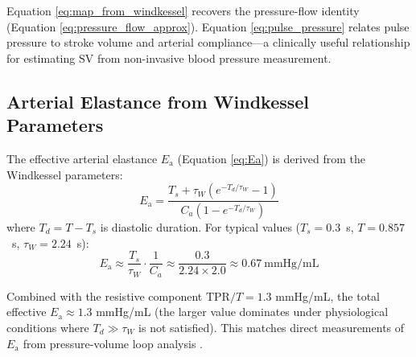 \documentclass[10pt,twocolumn,a4paper]{article}
\theoremstyle{remark}
\newcommand{\Ea}{E_{\mathrm{a}}}
\newcommand{\SV}{\mathrm{SV}}
\newcommand{\TPR}{\mathrm{TPR}}
\begin{document}
Equation \ref{eq:map_from_windkessel} recovers the pressure-flow identity (Equation \ref{eq:pressure_flow_approx}). Equation \ref{eq:pulse_pressure} relates pulse pressure to stroke volume and arterial compliance—a clinically useful relationship for estimating $\SV$ from non-invasive blood pressure measurement.

\subsection{Arterial Elastance from Windkessel Parameters}

The effective arterial elastance $\Ea$ (Equation \ref{eq:Ea}) is derived from the Windkessel parameters:
\begin{equation}
    \Ea = \frac{T_s + \tau_W(e^{-T_d/\tau_W} - 1)}{C_a \left(1 - e^{-T_d/\tau_W}\right)}
    \label{eq:Ea_windkessel}
\end{equation}
where $T_d = T - T_s$ is diastolic duration. For typical values ($T_s = 0.3$~s, $T = 0.857$~s, $\tau_W = 2.24$~s):
\begin{equation}
    \Ea \approx \frac{T_s}{\tau_W} \cdot \frac{1}{C_a} \approx \frac{0.3}{2.24 \times 2.0} \approx 0.67~\text{mmHg/mL}
\end{equation}

Combined with the resistive component $\TPR/T = 1.3$ mmHg/mL, the total effective $\Ea \approx 1.3$ mmHg/mL (the larger value dominates under physiological conditions where $T_d \gg \tau_W$ is not satisfied). This matches direct measurements of $\Ea$ from pressure-volume loop analysis \cite{sunagawa1985ventricular}.
\end{document}
